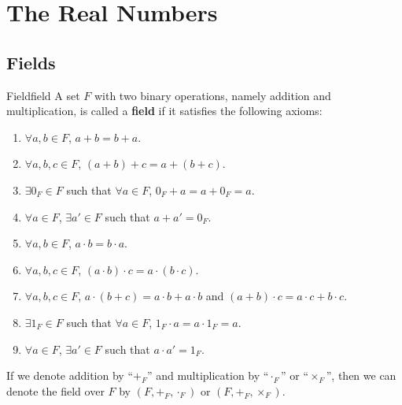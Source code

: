 \documentclass[math]{amznotes}
\theoremstyle{remark}
\begin{document}
\tableofcontents

\chapter{The Real Numbers}
\section{Fields}
\begin{dfnbox}{Field}{field}
    A set $F$ with two binary operations, namely addition and multiplication, is called a {\color{red} \textbf{field}} if it satisfies the following axioms:
    \begin{enumerate}
        \item $\forall a, b \in F$, $a + b = b + a$.
        \item $\forall a, b, c \in F$, $(a + b) + c = a + (b + c)$.
        \item $\exists 0_F \in F$ such that $\forall a \in F$, $0_F + a = a + 0_F = a$.
        \item $\forall a \in F$, $\exists a' \in F$ such that $a + a' = 0_F$.
        \item $\forall a, b \in F$, $a \cdot b = b \cdot a$.
        \item $\forall a, b, c \in F$, $(a \cdot b) \cdot c = a \cdot (b \cdot c)$.
        \item $\forall a, b, c \in F$, $a \cdot (b + c) = a \cdot b + a \cdot b$ and $(a + b) \cdot c = a \cdot c + b \cdot c$.
        \item $\exists 1_F \in F$ such that $\forall a \in F$, $1_F \cdot a = a \cdot 1_F = a$.
        \item $\forall a \in F$, $\exists a' \in F$ such that $a \cdot a' = 1_F$.
    \end{enumerate}
\end{dfnbox}
If we denote addition by ``$+_F$'' and multiplication by ``$\cdot_F$'' or ``$\times_F$'', then we can denote the field over $F$ by $(F, +_F, \cdot_F)$ or $(F, +_F, \times_F)$.
\end{document}
